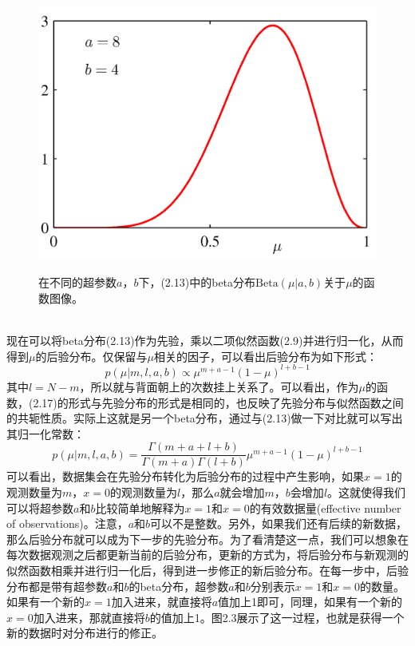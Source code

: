 \documentclass[b5paper]{book}
\numberwithin{equation}{chapter}
\begin{document}
{\begin{figure}[ht]
\begin{minipage}[t]{0.5\linewidth}
		\includegraphics[scale=0.8]{Images/2-2d.png}
		\label{fig:2-2d}
		\end{minipage}
		\caption{在不同的超参数$a$，$b$下，(2.13)中的beta分布$\mathrm{Beta}(\mu|a,b)$关于$\mu$的函数图像。}
	\end{figure}
	\\
	\indent 现在可以将beta分布(2.13)作为先验，乘以二项似然函数(2.9)并进行归一化，从而得到$\mu$的后验分布。仅保留与$\mu$相关的因子，可以看出后验分布为如下形式：
	\begin{equation}
		p(\mu|m,l,a,b) \propto \mu^{m+a-1}(1-\mu)^{l+b-1}
	\end{equation}
	其中$l=N-m$，所以就与背面朝上的次数挂上关系了。可以看出，作为$\mu$的函数，(2.17)的形式与先验分布的形式是相同的，也反映了先验分布与似然函数之间的共轭性质。实际上这就是另一个beta分布，通过与(2.13)做一下对比就可以写出其归一化常数：
	\begin{equation}
		p(\mu|m,l,a,b)=\frac{\Gamma(m+a+l+b)}{\Gamma(m+a)\Gamma(l+b)}\mu^{m+a-1}(1-\mu)^{l+b-1}
	\end{equation}
	\indent 可以看出，数据集会在先验分布转化为后验分布的过程中产生影响，如果$x=1$的观测数量为$m$，$x=0$的观测数量为$l$，那么$a$就会增加$m$，$b$会增加$l$。这就使得我们可以将超参数$a$和$b$比较简单地解释为$x=1$和$x=0$的有效数据量(effective number of observations)。注意，$a$和$b$可以不是整数。另外，如果我们还有后续的新数据，那么后验分布就可以成为下一步的先验分布。为了看清楚这一点，我们可以想象在每次数据观测之后都更新当前的后验分布，更新的方式为，将后验分布与新观测的似然函数相乘并进行归一化后，得到进一步修正的新后验分布。在每一步中，后验分布都是带有超参数$a$和$b$的beta分布，超参数$a$和$b$分别表示$x=1$和$x=0$的数量。如果有一个新的$x=1$加入进来，就直接将$a$值加上1即可，同理，如果有一个新的$x=0$加入进来，那就直接将$b$的值加上1。图2.3展示了这一过程，也就是获得一个新的数据时对分布进行的修正。
}
\end{document}
